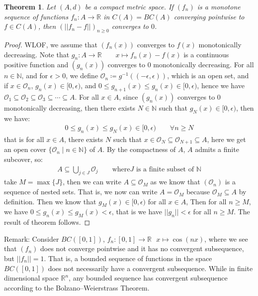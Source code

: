 \documentclass[11pt]{book}
\theoremstyle{break}
\theoremstyle{break}
\newtheorem{thm}{Theorem}[section]
\newcommand{\R}{\mathbb{R}}
\newcommand{\N}{\mathbb{N}}
\newcommand{\remark}{\color{blue}Remark: \color{black}}
\begin{document}
\begin{thm}
Let $(A,d)$ be a compact metric space. If $(f_n)$ is a monotone sequence of functions $f_n:A \to \R$ in $C(A) = BC(A)$ converging pointwise to $f \in C(A)$, then $(||f_n - f||)_{n\geq 0}$ converges to $0$. 
\end{thm}
\begin{proof}
WLOF, we assume that $(f_n(x))$ converges to $f(x)$ monotonically decreasing. Note that $g_n:A \to \R \qquad x\mapsto f_n(x) - f(x)$ is a continuous positive function and $(g_n(x))$ converges to $0$ monotonically decreasing. For all $n \in \N$, and for $\epsilon>0$, we define $\mathcal{O}_n\coloneqq g^{-1}((-\epsilon, \epsilon))$, which is an open set, and if $x \in \mathcal{O}_n$, $g_n(x) \in [0,\epsilon)$, and $0\leq g_{n+1}(x) \leq g_n(x) \in [0,\epsilon)$, hence we have $\mathcal{O}_1 \subseteq \mathcal{O}_2 \subseteq \mathcal{O}_3\subseteq \cdots \subseteq A$. For all $x \in A$, since $(g_n(x))$ converges to $0$ monotonically decreasing,  then there exists $N \in \N$ such that $g_N(x) \in [0,\epsilon)$, then we have:
\begin{align*}
0 \leq g_n(x) \leq g_N(x) \in [0,\epsilon) \qquad\forall n \geq N
\end{align*}
that is for all $x \in A$, there exists $N$ such that $x \in \mathcal{O}_N \subseteq \mathcal{O}_{N+1} \subseteq A$, here we get an open cover $\{\mathcal{O}_n \mid n \in \N\}$ of $A$. By the compactness of $A$, $A$ admits a finite subcover, so:
\begin{align*}
A \subseteq \bigcup_{j \in J}\mathcal{O}_j \qquad\text{where} J \text{ is a finite subset of }\N
\end{align*}
take $M = \max\{J\}$, then we can write $A \subseteq \mathcal{O}_M$ as we know that $(\mathcal{O}_n)$ is a sequence of nested sets. That is, we now can write $A = \mathcal{O}_M$ because $\mathcal{O}_M \subseteq A$ by definition. Then we know that $g_M(x) \in [0,\epsilon)$ for all $x \in A$, Then for all $ n\geq M$, we have $0 \leq g_n(x) \leq g_M(x) < \epsilon$, that is we have $||g_n||<\epsilon$ for all $n \geq M$. The result of theorem follows. 
\end{proof}


\remark Consider $BC([0,1])$, $f_n:[0,1]\to \R\ \ \ x\mapsto \cos(nx)$, where we see that $(f_n)$ does not converge pointwise and it has no convergent subsequence, but $||f_n|| = 1$. That is, a bounded sequence of functions in the space $BC([0,1])$ does not necessarily have a convergent subsequence. While in finite dimensional space $\R^n$, any bounded sequence has convergent subsequence according to the Bolzano–Weierstrass Theorem.\\
\end{document}

